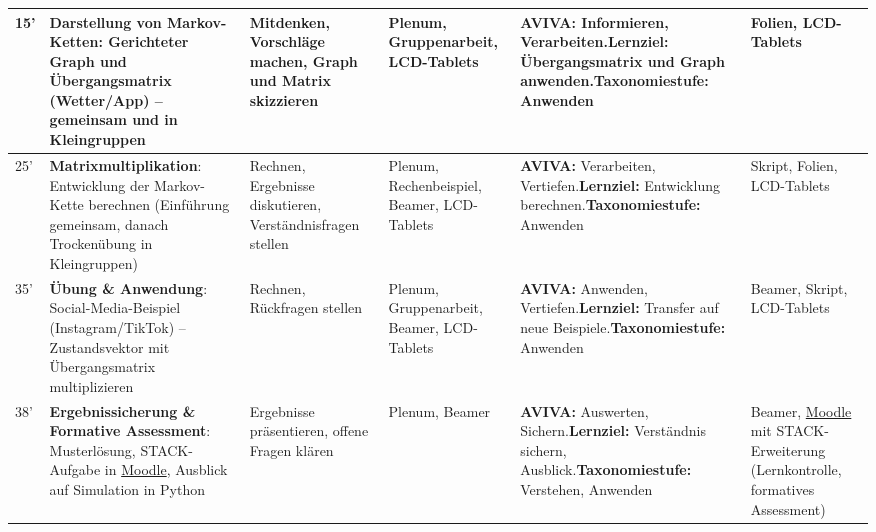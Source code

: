 \begin{landscape}
\begin{longtable}{@{}l|p{5cm}|p{5cm}|p{4cm}|p{5cm}|p{5cm}@{}}
            15' & \textbf{Darstellung von Markov-Ketten}: Gerichteter Graph und Übergangsmatrix (Wetter/App) -- gemeinsam und in Kleingruppen & Mitdenken, Vorschläge machen, Graph und Matrix skizzieren & Plenum, Gruppenarbeit, LCD-Tablets & \textbf{AVIVA:} Informieren, Verarbeiten.\newline\textbf{Lernziel:} Übergangsmatrix und Graph anwenden.\newline\textbf{Taxonomiestufe:} Anwenden & Folien, LCD-Tablets \\\midrule

            25' & \textbf{Matrixmultiplikation}: Entwicklung der Markov-Kette berechnen (Einführung gemeinsam, danach Trockenübung in Kleingruppen) & Rechnen, Ergebnisse diskutieren, Verständnisfragen stellen & Plenum, Rechenbeispiel, Beamer, LCD-Tablets & \textbf{AVIVA:} Verarbeiten, Vertiefen.\newline\textbf{Lernziel:} Entwicklung berechnen.\newline\textbf{Taxonomiestufe:} Anwenden & Skript, Folien, LCD-Tablets \\\midrule

            35' & \textbf{Übung \& Anwendung}: Social-Media-Beispiel (Instagram/TikTok) -- Zustandsvektor mit Übergangsmatrix multiplizieren & Rechnen, Rückfragen stellen & Plenum, Gruppenarbeit, Beamer, LCD-Tablets & \textbf{AVIVA:} Anwenden, Vertiefen.\newline\textbf{Lernziel:} Transfer auf neue Beispiele.\newline\textbf{Taxonomiestufe:} Anwenden & Beamer, Skript, LCD-Tablets \\\midrule

            38' & \textbf{Ergebnissicherung \& Formative Assessment}: Musterlösung, STACK-Aufgabe in \href{https://moodle.kzn.ch}{Moodle}, Ausblick auf Simulation in Python & Ergebnisse präsentieren, offene Fragen klären & Plenum, Beamer & \textbf{AVIVA:} Auswerten, Sichern.\newline\textbf{Lernziel:} Verständnis sichern, Ausblick.\newline\textbf{Taxonomiestufe:} Verstehen, Anwenden & Beamer, \href{https://moodle.kzn.ch}{Moodle} mit STACK-Erweiterung (Lernkontrolle, formatives Assessment) \\
        \end{longtable}



\end{landscape}
